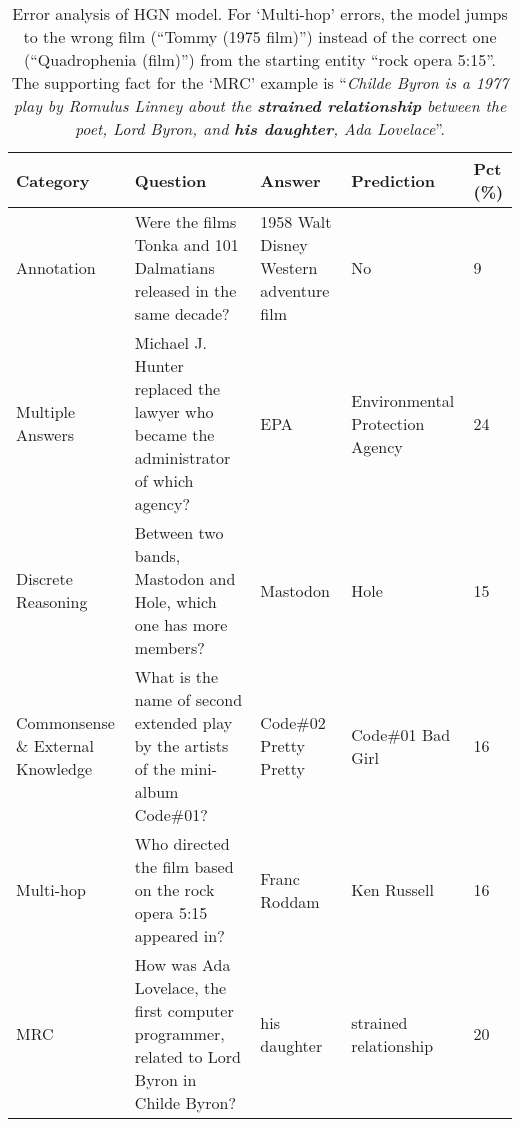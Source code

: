 \documentclass[11pt,a4paper]{article}
\begin{document}
\begin{table*}[t!]
\centering
\begin{adjustbox}{scale=0.90,center}
\begin{tabular}{p{2cm}p{5cm}p{3cm}p{3cm}p{1.5cm}}
\toprule
Category & Question & Answer & Prediction & Pct (\%)\\ 
\midrule
Annotation &  Were the films Tonka and 101 Dalmatians released in the same decade? & 1958 Walt Disney Western adventure film & No & 9 \\ 
\midrule
Multiple Answers & Michael J. Hunter replaced the lawyer who became the administrator of which agency? & EPA & Environmental Protection Agency & 24 \\
\midrule
Discrete Reasoning  &  Between two bands, Mastodon and Hole, which one has more members? &  Mastodon & Hole & 15 \\ \midrule
Commonsense \& External Knowledge & What is the name of second extended play by the artists of the mini-album Code\#01? & Code\#02 Pretty~ Pretty & Code\#01 Bad Girl & 16 \\
\midrule
Multi-hop & Who directed the film based on the rock opera 5:15 appeared in? & Franc Roddam & Ken Russell & 16 \\
\midrule
MRC & How was Ada Lovelace, the first computer programmer, related to Lord Byron in Childe Byron? & his daughter & strained relationship & 20 \\
\bottomrule
\end{tabular}
\end{adjustbox}
\caption{\label{table:error_example} Error analysis of HGN model. For `Multi-hop' errors, the model jumps to the wrong film (``Tommy (1975 film)'') instead of the correct one (``Quadrophenia (film)'') from the starting entity ``rock opera 5:15''. The supporting fact for the `MRC' example is ``\textit{Childe Byron is a 1977 play by Romulus Linney about the \textbf{strained relationship} between the poet, Lord Byron, and \textbf{his daughter}, Ada Lovelace}''.  }
\end{table*}
 
\end{document}
